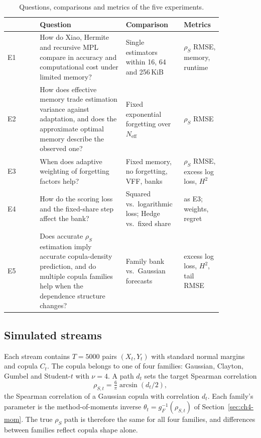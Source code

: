 \begin{table}[ht]
\centering\small
\caption{Questions, comparisons and metrics of the five experiments.}\label{tab:ch6-experiments}
\begin{tabular}{@{}lp{0.40\linewidth}p{0.27\linewidth}p{0.18\linewidth}@{}}
\toprule
 & Question & Comparison & Metrics \\
\midrule
E1 & How do Xiao, Hermite and recursive MPL compare in accuracy and computational cost under limited memory? & Single estimators within 16, 64 and 256\,KiB & $\rho_S$ RMSE, memory, runtime \\
E2 & How does effective memory trade estimation variance against adaptation, and does the approximate optimal memory describe the observed one? & Fixed exponential forgetting over $N_{\mathrm{eff}}$ & $\rho_S$ RMSE \\
E3 & When does adaptive weighting of forgetting factors help? & Fixed memory, no forgetting, VFF, banks & $\rho_S$ RMSE, excess log loss, $H^2$ \\
E4 & How do the scoring loss and the fixed-share step affect the bank? & Squared vs.\ logarithmic loss; Hedge vs.\ fixed share & as E3; weights, regret \\
E5 & Does accurate $\rho_S$ estimation imply accurate copula-density prediction, and do multiple copula families help when the dependence structure changes? & Family bank vs.\ Gaussian forecasts & excess log loss, $H^2$, tail RMSE \\
\bottomrule
\end{tabular}
\end{table}

\subsection{Simulated streams}\label{sec:ch6-dgp}

Each stream contains $T = 5000$ pairs $(X_t, Y_t)$ with standard normal margins and copula $C_t$.
The copula belongs to one of four families: Gaussian, Clayton, Gumbel and Student-$t$ with $\nu = 4$.
A path $d_t$ sets the target Spearman correlation
\begin{equation}\label{eq:ch6-target}
  \rho_{S,t} = \tfrac{6}{\pi}\arcsin(d_t/2),
\end{equation}
the Spearman correlation of a Gaussian copula with correlation $d_t$.
Each family's parameter is the method-of-moments inverse $\theta_t = g_F^{-1}(\rho_{S,t})$ of Section~\ref{sec:ch4-mom}.
The true $\rho_S$ path is therefore the same for all four families, and differences between families reflect copula shape alone.

